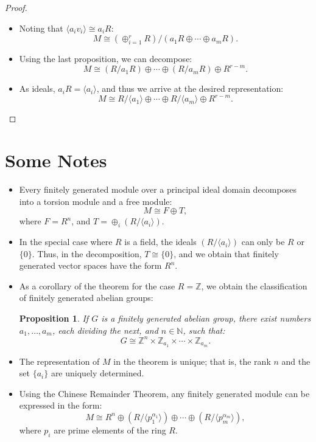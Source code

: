 \documentclass{article}
\newif\ifusemulticols
\theoremstyle{definition}
\theoremstyle{remark}
\theoremstyle{plain}
\theoremstyle{plain}
\newtheorem{prop}[theorem]{Proposition}
\newenvironment{mymulticols}
    { \ifusemulticols \begin{multicols}{2} \fi }
    { \ifusemulticols \end{multicols} \fi }
\newcommand{\N}{\mathbb{N}}
\newcommand{\Z}{\mathbb{Z}}
\begin{document}
\begin{mymulticols}
\begin{proof}
\begin{itemize}
        \item Noting that $\langle a_i v_i \rangle \cong a_i R$:
            $$M \cong (\oplus_{i=1}^r R) / (a_1 R \oplus \cdots \oplus a_m R).$$

        \item Using the last proposition, we can decompose:
            $$M \cong \left(R / a_1 R\right) \oplus \cdots \oplus \left(R / a_m R\right) \oplus R^{r-m}.$$

        \item As ideals, $a_i R = \langle a_i \rangle$, and thus we arrive at the desired
            representation:
            $$M \cong R / \langle a_1 \rangle \oplus \cdots \oplus R / \langle a_m \rangle \oplus
            R^{r-m}.$$
    \end{itemize}
\end{proof}

\section{Some Notes}%

\begin{itemize}
    \item Every finitely generated module over a principal ideal domain decomposes into a torsion module and a free module: $$M \cong F \oplus T,$$
        where $F = R^n$, and $T = \oplus_i (R / \langle a_i \rangle)$.
    \item In the special case where $R$ is a field, the ideals $(R / \langle a_i \rangle)$ can only
        be $R$ or $\{0\}$. Thus, in the decomposition, $T \cong \{0\}$, and we obtain that finitely
        generated vector spaces have the form $R^n$.
    \item As a corollary of the theorem for the case $R = \Z$, we obtain the classification of
        finitely generated abelian groups:
        \begin{prop}
            If $G$ is a finitely generated abelian group, there exist numbers $a_1, \ldots, a_m$,
            each dividing the next, and $n \in \N$, such that: $$G \cong \Z^n \times \Z_{a_1} \times
            \cdots \times \Z_{a_m}.$$
        \end{prop}
    \item The representation of $M$ in the theorem is unique; that is, the rank $n$ and the set
        $\{a_i\}$ are uniquely determined.
    \item Using the Chinese Remainder Theorem, any finitely generated module can be expressed in the form:
        $$M \cong R^n \oplus (R / \langle p_1^{\alpha_1} \rangle) \oplus \cdots \oplus (R / \langle p_m^{\alpha_m} \rangle),$$
        where $p_i$ are prime elements of the ring $R$.
\end{itemize}


\end{mymulticols}
\end{document}
